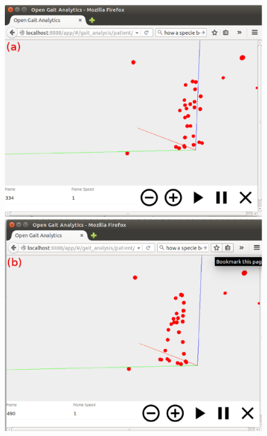 \documentclass[journal]{IEEEtran}
\begin{document}
\begin{figure}[tb]
  \centering
  \begin{minipage}[b]{0.32\textwidth}
    \includegraphics[width=\textwidth]{img/animation1.eps}
  \end{minipage}
  \hfill
  \begin{minipage}[b]{0.32\textwidth}
    \includegraphics[width=\textwidth]{img/animation2.eps}
  \end{minipage}
  \hfill
  \begin{minipage}[b]{0.32\textwidth}

\end{minipage}
\end{figure}
\end{document}
